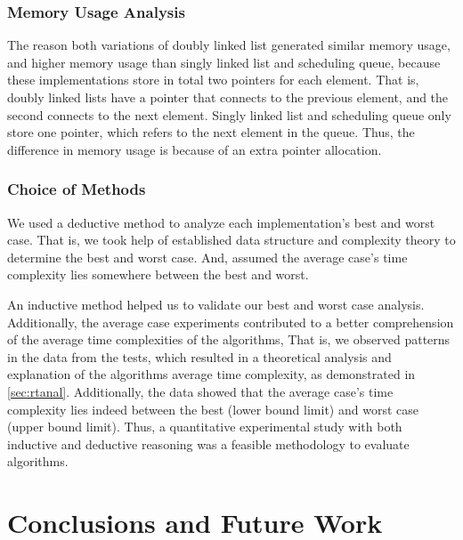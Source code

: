 \documentclass[a4paper,11pt]{kth-mag}
\newcommand*{\skippara}{\par\vspace{\baselineskip} \noindent}
\begin{document}
\subsection{Memory Usage Analysis}
The reason both variations of doubly linked list generated similar memory usage, and higher memory usage than singly linked list and scheduling queue, because these implementations store in total two pointers for each element.
That is, doubly linked lists have a pointer that connects to the previous element, and the second connects to the next element.
Singly linked list and scheduling queue only store one pointer, which refers to the next element in the queue.
Thus, the difference in memory usage is because of an extra pointer allocation.

\subsection{Choice of Methods}
We used a deductive method to analyze each implementation's best and worst case.
That is, we took help of established data structure and complexity theory to determine the best and worst case.
And, assumed the average case's time complexity lies somewhere between the best and worst.

\skippara An inductive method helped us to validate our best and worst case analysis.
Additionally, the average case experiments contributed to a better comprehension of the average time complexities of the algorithms,
That is, we observed patterns in the data from the tests, which resulted in a theoretical analysis and explanation of the algorithms average time complexity, as demonstrated in \cref{sec:rtanal}.
Additionally, the data showed that the average case's time complexity lies indeed between the best (lower bound limit) and worst case (upper bound limit).
Thus, a quantitative experimental study with both inductive and deductive reasoning was a feasible methodology to evaluate algorithms.


\chapter{Conclusions and Future Work}
\end{document}
